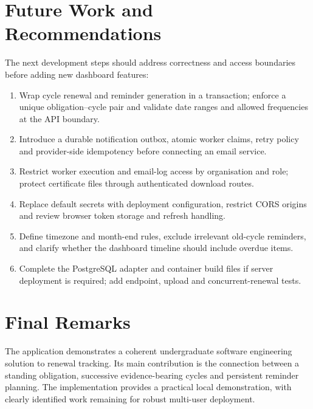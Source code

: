 \section{Future Work and Recommendations}
The next development steps should address correctness and access boundaries before adding new dashboard features:
\begin{enumerate}
\item Wrap cycle renewal and reminder generation in a transaction; enforce a unique obligation--cycle pair and validate date ranges and allowed frequencies at the API boundary.
\item Introduce a durable notification outbox, atomic worker claims, retry policy and provider-side idempotency before connecting an email service.
\item Restrict worker execution and email-log access by organisation and role; protect certificate files through authenticated download routes.
\item Replace default secrets with deployment configuration, restrict CORS origins and review browser token storage and refresh handling.
\item Define timezone and month-end rules, exclude irrelevant old-cycle reminders, and clarify whether the dashboard timeline should include overdue items.
\item Complete the PostgreSQL adapter and container build files if server deployment is required; add endpoint, upload and concurrent-renewal tests.
\end{enumerate}

\section{Final Remarks}
The application demonstrates a coherent undergraduate software engineering solution to renewal tracking. Its main contribution is the connection between a standing obligation, successive evidence-bearing cycles and persistent reminder planning. The implementation provides a practical local demonstration, with clearly identified work remaining for robust multi-user deployment.
